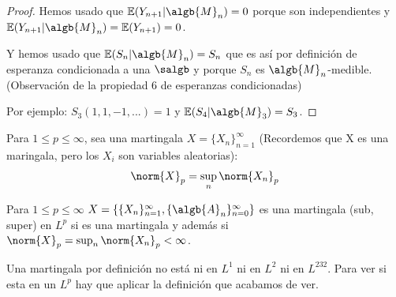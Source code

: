 \documentclass{apuntes}
\begin{document}
\begin{example}
\begin{enumerate}
\begin{proof}
Hemos usado que $\mathbb{E}(Y_{n+1}|\algb{M}_n)=0$ porque son independientes y $\mathbb{E}(Y_{n+1}|\algb{M}_n)=\mathbb{E}(Y_{n+1})=0$.

Y hemos usado que $\mathbb{E}(S_{n}|\algb{M}_n)=S_n$ que es así por definición de esperanza condicionada a una $\salgb$ y porque $S_n$ es $\algb{M}_n$-medible. (Observación de la propiedad 6 de esperanzas condicionadas)





Por ejemplo: $S_3(1,1,-1,...)=1$ y $\mathbb{E}(S_4|\algb{M}_3)=S_3$.

\end{proof}
\end{enumerate}
\end{example}

\begin{defn}
Para $1 \leq p \leq \infty$, sea una martingala $X=\{X_n\}_{n=1}^{\infty}$ (Recordemos que X es una maringala, pero los $X_i$ son variables aleatorias):
\[
\norm{X}_p = \sup_n \norm{X_n}_p
\]
\end{defn}

\begin{defn}[martingala en $L^p$]
Para $1 \leq p \leq \infty$ $X=\{\{X_n\}_{n=1}^{\infty}, \{\algb{A}_n\}_{n=0}^{\infty}\}$ es una martingala (sub, super) en $L^p$ si es una martingala y además si $\norm{X}_p = \sup_n \norm{X_n}_p < \infty$.
\end{defn}

\obs Una martingala por definición no está ni en $L^1$ ni en $L^2$ ni en $L^232$. Para ver si esta en un $L^p$ hay que aplicar la definición que acabamos de ver.
\end{document}
